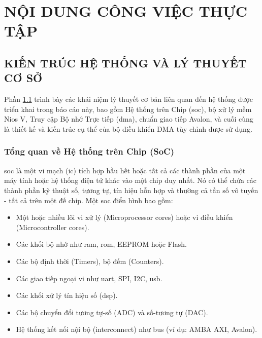 \chapter{NỘI DUNG CÔNG VIỆC THỰC TẬP}\label{chap:noi_dung_cong_viec}
\section{KIẾN TRÚC HỆ THỐNG VÀ LÝ THUYẾT CƠ SỞ} %
\label{sec:chapter2_content} %
Phần \ref{sec:chapter2_content} trình bày các khái niệm lý thuyết cơ bản liên quan đến hệ thống được triển khai trong báo cáo này, bao gồm Hệ thống trên Chip (\acrshort{soc}), bộ xử lý mềm Nios V, Truy cập Bộ nhớ Trực tiếp (\acrshort{dma}), chuẩn giao tiếp Avalon, và cuối cùng là thiết kế và kiến trúc cụ thể của bộ điều khiển DMA tùy chỉnh được sử dụng.

\subsection{Tổng quan về Hệ thống trên Chip (SoC)}
\acrfull{soc} là một vi mạch (\acrshort{ic}) tích hợp hầu hết hoặc tất cả các thành phần của một máy tính hoặc hệ thống điện tử khác vào một chip duy nhất. Nó có thể chứa các thành phần kỹ thuật số, tương tự, tín hiệu hỗn hợp và thường cả tần số vô tuyến - tất cả trên một đế chip. Một \acrshort{soc} điển hình bao gồm:
\begin{itemize}
    \item Một hoặc nhiều lõi vi xử lý (Microprocessor cores) hoặc vi điều khiển (Microcontroller cores).
    \item Các khối bộ nhớ như \acrshort{ram}, \acrshort{rom}, EEPROM hoặc Flash.
    \item Các bộ định thời (Timers), bộ đếm (Counters).
    \item Các giao tiếp ngoại vi như \acrshort{uart}, SPI, I2C, \acrshort{usb}.
    \item Các khối xử lý tín hiệu số (\acrshort{dsp}).
    \item Các bộ chuyển đổi tương tự-số (ADC) và số-tương tự (DAC).
    \item Hệ thống kết nối nội bộ (interconnect) như bus (ví dụ: AMBA AXI, Avalon).
\end{itemize}

